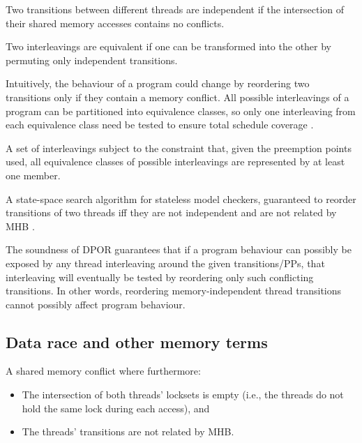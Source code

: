 \begin{definition}
Two transitions between different threads are independent if the intersection of their shared memory accesses contains no conflicts.
\end{definition}

\begin{definition}
Two interleavings are equivalent if one can be transformed into the other by permuting only independent transitions.
\end{definition}

Intuitively, the behaviour of a program could change by reordering two transitions only if they contain a memory conflict.
All possible interleavings of a program can be partitioned into equivalence classes,
so only one interleaving from each equivalence class need be tested to ensure total schedule coverage \cite{mazurkiewicz}.

\begin{definition}
	A set of interleavings subject to the constraint that, given the preemption points used, all equivalence classes of possible interleavings are represented by at least one member.
\end{definition}

\begin{definition}
	A state-space search algorithm for stateless model checkers,
	guaranteed to reorder transitions of two threads
	iff they are not independent and are not related by MHB \cite{dpor}.
	\label{def:dpor}
\end{definition}

The soundness of DPOR guarantees that if a program behaviour can possibly be exposed by any thread interleaving around the given transitions/PPs,
that interleaving will eventually be tested by reordering only such conflicting transitions.
In other words, reordering memory-independent thread transitions cannot possibly affect program behaviour.

\subsection{Data race and other memory terms}

\begin{definition}
A shared memory conflict where furthermore:
\begin{itemize}
	\item The intersection of both threads' locksets is empty (i.e., the threads do not hold the same lock during each access), and
	\item The threads' transitions are not related by MHB.
\end{itemize}
\end{definition}

